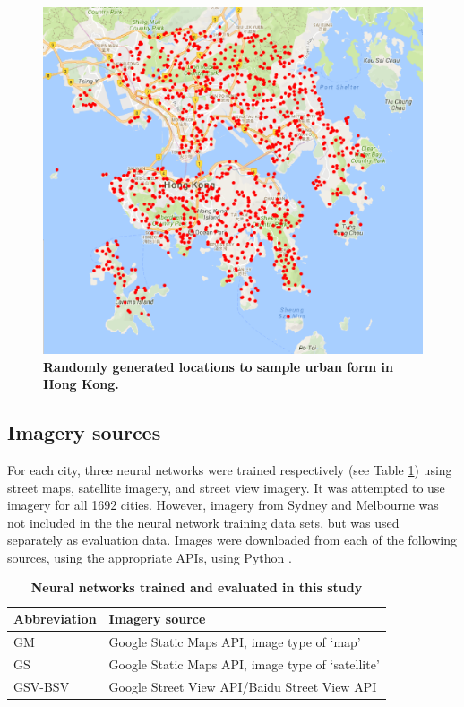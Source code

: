 \documentclass[10pt,letterpaper]{article}
\begin{document}
\begin{figure}[!htbp] 
    \centering    
\includegraphics[scale=1]{Images/HongKong.png} 
\caption{\bf Randomly generated locations to sample urban form in Hong Kong.} 
\label{fig:hongkong}  
\end{figure}


\label{methodsimagery}
\subsection*{Imagery sources}


For each city, three neural networks were trained respectively (see Table \ref{tab:neuralnetworks}) using street maps, satellite imagery, and street view imagery. It was attempted to use imagery for all 1692 cities. However, imagery from Sydney and Melbourne was not included in the the neural network training data sets, but was used separately as evaluation data. Images were downloaded from each of the following sources, using the appropriate APIs, using Python \cite{Python2016}.


\begin{table}[!htbp]
\caption{\bf Neural networks trained and evaluated in this study \label{tab:neuralnetworks}}     
\begin{tabular}{ l l }
 \hline Abbreviation   &  Imagery source \\ \hline
GM & Google Static Maps API, image type of `map'     \\ 
GS & Google Static Maps API, image type of `satellite'      \\
GSV-BSV & Google Street View API/Baidu Street View API     \\ \hline

\end{tabular}
\end{table}
\end{document}
